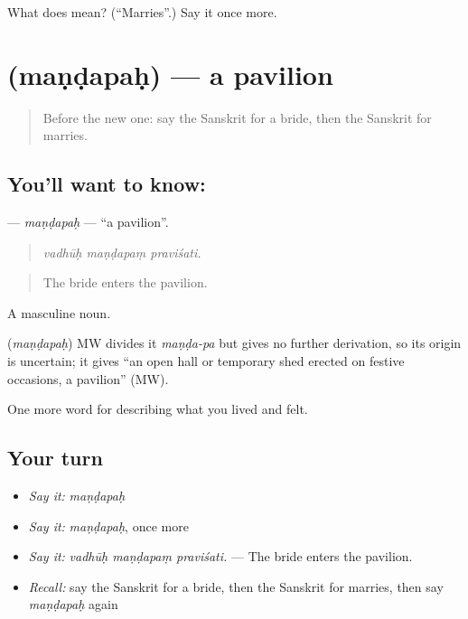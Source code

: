 \begin{tcolorbox}[breakable,colback=teal!4,colframe=teal!35!black,title={Before you move on}]
What does  mean? (\textquotedblleft{}Marries\textquotedblright{}.) Say it once more.
\end{tcolorbox}
\section[\texorpdfstring{\sk{मण्डपः} (maṇḍapaḥ)}{मण्डपः (maṇḍapaḥ)}]{ (maṇḍapaḥ) — a pavilion}

\label{lesson:SA-C496-mandapah}



\begin{quote}
Before the new one: say the Sanskrit for a bride, then the Sanskrit for marries.
\end{quote}

\subsection*{You'll want to know: }
\textbf{} — \emph{maṇḍapaḥ} — \textquotedblleft{}a pavilion\textquotedblright{}.

\begin{quote}
  
\end{quote}

\begin{quote}
\emph{vadhūḥ maṇḍapaṃ praviśati.}
\end{quote}

\begin{quote}
The bride enters the pavilion.
\end{quote}

A masculine noun.

\begin{cousinweb}
\textbf{} (\emph{maṇḍapaḥ}) MW divides it \emph{maṇḍa-pa} but gives no further derivation, so its origin is uncertain; it gives \textquotedblleft{}an open hall or temporary shed erected on festive occasions, a pavilion\textquotedblright{} (MW).
\end{cousinweb}

\begin{grammarlens}[title={What you've built}]
One more word for describing what you lived and felt.
\end{grammarlens}

\subsection*{Your turn}
\begin{itemize}
\raggedright
  \item \emph{Say it:} \emph{maṇḍapaḥ}
  \item \emph{Say it:} \emph{maṇḍapaḥ}, once more
  \item \emph{Say it:} \emph{vadhūḥ maṇḍapaṃ praviśati.} — The bride enters the pavilion.
  \item \emph{Recall:} say the Sanskrit for a bride, then the Sanskrit for marries, then say \emph{maṇḍapaḥ} again
\end{itemize}

